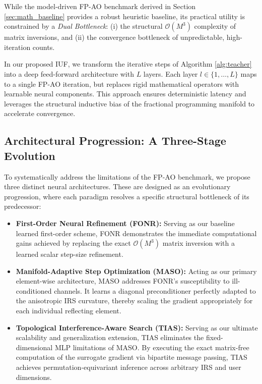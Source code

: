\documentclass[journal]{IEEEtran}
\begin{document}
While the model-driven FP-AO benchmark derived in Section \ref{sec:math_baseline} provides a robust heuristic baseline, its practical utility is constrained by a \textit{Dual Bottleneck}: (i) the structural $\mathcal{O}(M^3)$ complexity of matrix inversions, and (ii) the convergence bottleneck of unpredictable, high-iteration counts.  

In our proposed IUF, we transform the iterative steps of Algorithm \ref{alg:teacher} into a deep feed-forward architecture with $L$ layers. Each layer $l \in \{1, \dots, L\}$ maps to a single FP-AO iteration, but replaces rigid mathematical operators with learnable neural components. This approach ensures deterministic latency and leverages the structural inductive bias of the fractional programming manifold to accelerate convergence.

\subsection{Architectural Progression: A Three-Stage Evolution}
\label{subsec:progression}

To systematically address the limitations of the FP-AO benchmark, we propose three distinct neural architectures. These are designed as an evolutionary progression, where each paradigm resolves a specific structural bottleneck of its predecessor:

\begin{itemize}
    \item \textbf{First-Order Neural Refinement (FONR):} Serving as our baseline learned first-order scheme, FONR demonstrates the immediate computational gains achieved by replacing the exact $\mathcal{O}(M^3)$ matrix inversion with a learned scalar step-size refinement. 
    \item \textbf{Manifold-Adaptive Step Optimization (MASO):} Acting as our primary element-wise architecture, MASO addresses FONR's susceptibility to ill-conditioned channels. It learns a diagonal preconditioner perfectly adapted to the anisotropic IRS curvature, thereby scaling the gradient appropriately for each individual reflecting element.
    \item \textbf{Topological Interference-Aware Search (TIAS):} Serving as our ultimate scalability and generalization extension, TIAS eliminates the fixed-dimensional MLP limitations of MASO. By executing the exact matrix-free computation of the surrogate gradient via bipartite message passing, TIAS achieves permutation-equivariant inference across arbitrary IRS and user dimensions.
\end{itemize}
\end{document}
